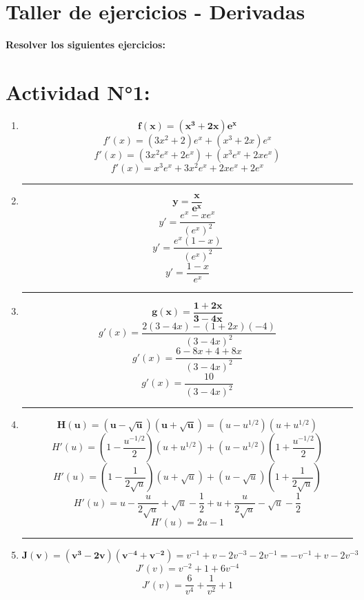 \documentclass[12pt]{article}
\begin{document}
    

    \section*{\centering Taller de ejercicios - Derivadas} 
        \textbf{Resolver los siguientes ejercicios:}

    \section*{Actividad N°1:}
        \vspace{0.5cm}
        \begin{enumerate}[label=\textbf{\arabic*)}] 
            \hrule\item \[\bm{f(x) = (x^3 + 2x) e^x}\]
                \[f'(x) = (3x^2 + 2)e^x + (x^3 + 2x) e^x\] 
                \[f'(x) = (3x^2e^x + 2e^x) + (x^3e^x + 2xe^x)\] 
                \[f'(x) = x^3e^x + 3x^2e^x + 2xe^x + 2e^x\] 

            \hrule\item \[\bm{y = \frac{x}{e^x}}\]
                \[y' = \frac{e^x - xe^x}{(e^x)^2}\]
                \[y' = \frac{e^x (1 - x)}{(e^x)^2}\]
                \[y' = \frac{1 - x}{e^x}\]

            \hrule\item \[\bm{g(x) = \frac{1 + 2x}{3 - 4x}}\]
                \[g'(x) = \frac{2(3 - 4x) - (1 + 2x)(-4)}{(3 - 4x)^2}\]
                \[g'(x) = \frac{6 - 8x + 4 + 8x}{(3 - 4x)^2}\]
                \[g'(x) = \frac{10 }{(3 - 4x)^2}\]

            \hrule\item \[\bm{H(u) = (u - \sqrt{u})(u + \sqrt{u})} = (u - u^{1/2})(u + u^{1/2})\]
                \[H'(u) = \left(1 - \frac{u^{-1/2}}{2}\right)(u + u^{1/2}) + (u - u^{1/2})\left(1 + \frac{u^{-1/2}}{2}\right)\]
                \[H'(u) = \left(1 - \frac{1}{2\sqrt{u}}\right)(u + \sqrt{u}) + (u - \sqrt{u})\left(1 + \frac{1}{2\sqrt{u}}\right)\]
                \[H'(u) = u - \frac{u}{2\sqrt{u}} + \sqrt{u} - \frac{1}{2} + u + \frac{u}{2\sqrt{u}} - \sqrt{u} - \frac{1}{2}\]
                \[H'(u) = 2u - 1\]

            \newpage
            \hrule\item \[\bm{J(v) = (v^3 - 2v)(v^{-4} + v^{-2})} = v^{-1} + v - 2v^{-3} - 2v^{-1} = -v^{-1} + v - 2v^{-3}\]
                \[J'(v) = v^{-2} + 1 + 6v^{-4}\]
                \[J'(v) = \frac{6}{v^4} + \frac{1}{v^2} + 1\]


\end{enumerate}
\end{document}
